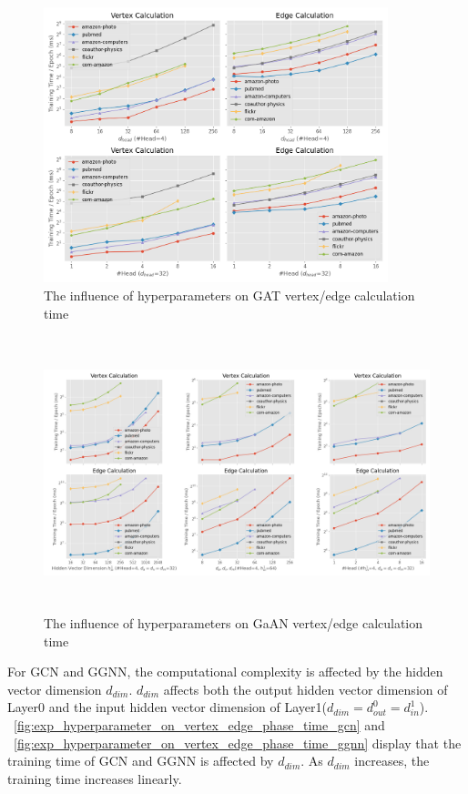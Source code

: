 \begin{figure}
	\centering
    \includegraphics[height=8cm]{figs/experiments/exp_hyperparameter_on_vertex_edge_phase_time_gat.png}
    \caption{The influence of hyperparameters on GAT vertex/edge calculation time}
	\label{fig:exp_hyperparameter_on_vertex_edge_phase_time_gat}
\end{figure}

\begin{figure}
	\centering
    \includegraphics[height=8cm]{figs/experiments/exp_hyperparameter_on_vertex_edge_phase_time_gaan.png}
    \caption{The influence of hyperparameters on GaAN vertex/edge calculation time}
	\label{fig:exp_hyperparameter_on_vertex_edge_phase_time_gaan}
\end{figure}

For GCN and GGNN, the computational complexity is affected by the hidden vector dimension $d_{dim}$. $d_{dim}$ affects both the output hidden vector dimension of Layer0 and
the input hidden vector dimension of Layer1($d_{dim} = d^0_{out} = d^1_{in}$).
\figurename~\ref{fig:exp_hyperparameter_on_vertex_edge_phase_time_gcn} and \figurename~\ref{fig:exp_hyperparameter_on_vertex_edge_phase_time_ggnn}
display that the training time of GCN and GGNN is affected by $d_{dim}$. As $d_{dim}$ increases, the training time increases linearly.

